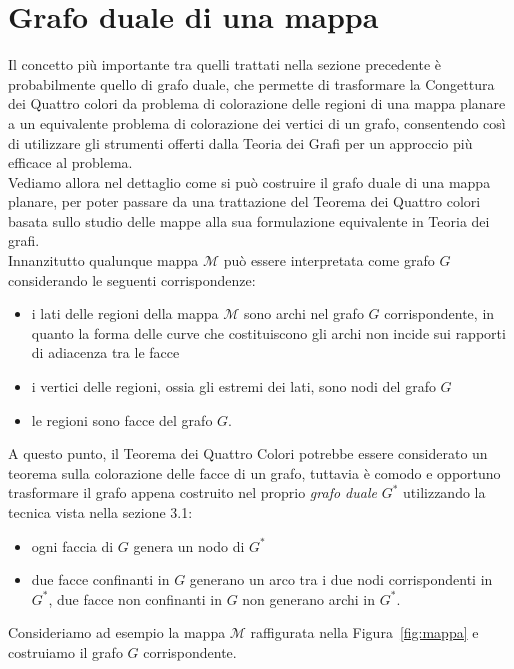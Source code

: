\documentclass[a4paper,12pt,titlepage]{report}
\begin{document}
	\section{Grafo duale di una mappa}
	Il concetto più importante tra quelli trattati nella sezione precedente è probabilmente quello di grafo duale, che permette di trasformare la Congettura dei Quattro colori da problema di colorazione delle regioni di una mappa planare a un equivalente problema di colorazione dei vertici di un grafo, consentendo così di utilizzare gli strumenti offerti dalla Teoria dei Grafi per un approccio più efficace al problema.
	\\Vediamo allora nel dettaglio come si può costruire il grafo duale di una mappa planare, per poter passare da una trattazione del Teorema dei Quattro colori basata sullo studio delle mappe alla sua formulazione equivalente in Teoria dei grafi.
	\\Innanzitutto qualunque mappa $\mathcal{M}$ può essere interpretata come grafo $G$ considerando le seguenti corrispondenze:
    \begin{itemize}
		\item i lati delle regioni della mappa $\mathcal{M}$ sono archi nel grafo $G$ corrispondente, in quanto la forma delle curve che costituiscono gli archi non incide sui rapporti di adiacenza tra le facce
		\item i vertici delle regioni, ossia gli estremi dei lati, sono nodi del grafo $G$
		\item le regioni sono facce del grafo $G$.
	\end{itemize}
	A questo punto, il Teorema dei Quattro Colori potrebbe essere considerato un teorema sulla colorazione delle facce di un grafo, tuttavia è comodo e opportuno trasformare il grafo appena costruito nel proprio \emph{grafo duale} $G^*$ utilizzando la tecnica vista nella sezione 3.1:
	\begin{itemize}
		\item ogni faccia di $G$ genera un nodo di $G^*$
		\item due facce confinanti in $G$ generano un arco tra i due nodi corrispondenti in $G^*$, due facce non confinanti in $G$ non generano archi in $G^*$.
	\end{itemize}
	Consideriamo ad esempio la mappa $\mathcal{M}$ raffigurata nella Figura~\ref{fig:mappa} e costruiamo il grafo $G$ corrispondente.
\end{document}

